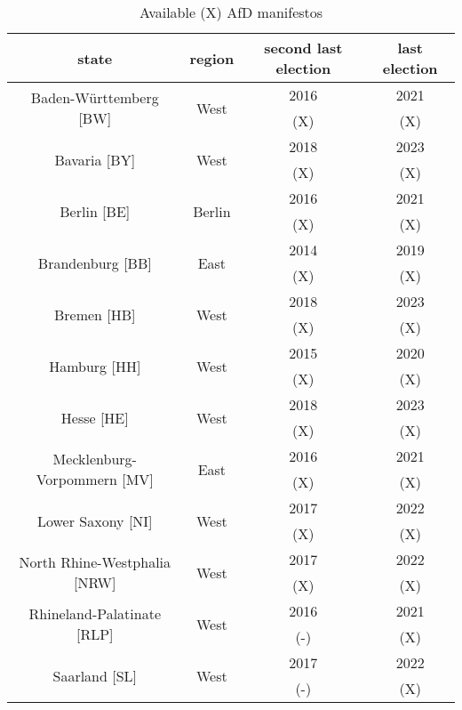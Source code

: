 \documentclass[a4paper]{scrreprt}
\begin{document}
\begin{table}\begin{center}
\caption{Available (X) AfD manifestos}
\label{tab:tab1}
\begin{tabular}{c c c c}
    \hline
    state & region & second last election & last election \\ [0.5ex]
    \hline\hline
    \multirow{2}{*}{Baden-Württemberg [BW]} & \multirow{2}{*}{West} & 2016 & 2021 \\ && (X) & (X) \\
    \hline
    \multirow{2}{*}{Bavaria [BY]} & \multirow{2}{*}{West} & 2018 & 2023 \\ && (X) & (X) \\
    \hline
    \multirow{2}{*}{Berlin [BE]} & \multirow{2}{*}{Berlin} & 2016 & 2021 \\ && (X) & (X) \\
    \hline
    \multirow{2}{*}{Brandenburg [BB]} & \multirow{2}{*}{East} & 2014 & 2019 \\ && (X) & (X) \\
    \hline
    \multirow{2}{*}{Bremen [HB]} & \multirow{2}{*}{West} & 2018 & 2023 \\ && (X) & (X) \\
    \hline
    \multirow{2}{*}{Hamburg [HH]} & \multirow{2}{*}{West} & 2015 & 2020 \\ && (X) & (X) \\
    \hline
    \multirow{2}{*}{Hesse [HE]} & \multirow{2}{*}{West} & 2018 & 2023 \\ && (X) & (X) \\
    \hline
    \multirow{2}{*}{Mecklenburg-Vorpommern [MV]} & \multirow{2}{*}{East} & 2016 & 2021 \\ && (X) & (X) \\
    \hline
    \multirow{2}{*}{Lower Saxony [NI]} & \multirow{2}{*}{West} & 2017 & 2022 \\ && (X) & (X) \\
    \hline
    \multirow{2}{*}{North Rhine-Westphalia [NRW]} & \multirow{2}{*}{West} & 2017 & 2022 \\ && (X) & (X) \\
    \hline
    \multirow{2}{*}{Rhineland-Palatinate [RLP]} & \multirow{2}{*}{West} & 2016 & 2021 \\ && (-) & (X) \\
    \hline
    \multirow{2}{*}{Saarland [SL]} & \multirow{2}{*}{West} & 2017 & 2022 \\ && (-) & (X) \\

\end{tabular}
\end{center}
\end{table}
\end{document}
